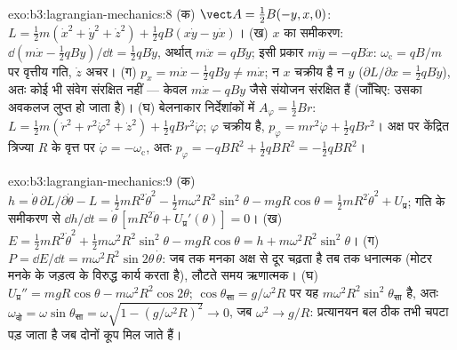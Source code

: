 \begin{solution}{exo:b3:lagrangian-mechanics:8}
(क) $\vect A = \tfrac12 B(-y, x, 0)$:
$L = \tfrac12 m(\dot x^2 + \dot y^2 + \dot z^2) + \tfrac12 qB(x\dot y -
y\dot x)$। (ख) $x$ का समीकरण: $\dd(m\dot x - \tfrac12 qBy)/\dd t =
\tfrac12 qB\dot y$, अर्थात् $m\ddot x = qB\dot y$; इसी प्रकार $m\ddot y =
-qB\dot x$: $\omega_{\text{c}} = qB/m$ पर वृत्तीय गति, $\dot z$
अचर। (ग) $p_x = m\dot x - \tfrac12 qBy \neq m\dot x$; न $x$
चक्रीय है न $y$ ($\partial L/\partial x = \tfrac12 qB\dot y$), अतः
कोई भी संवेग संरक्षित नहीं --- केवल $m\dot x -
qBy$ जैसे संयोजन संरक्षित हैं (जाँचिए: उसका अवकलज लुप्त हो जाता है)।
(घ) बेलनाकार निर्देशांकों में $A_\varphi = \tfrac12 Br$:
$L = \tfrac12 m(\dot r^2 + r^2\dot\varphi^2 + \dot z^2) + \tfrac12
qBr^2\dot\varphi$; $\varphi$ चक्रीय है, $p_\varphi = mr^2\dot\varphi +
\tfrac12 qBr^2$। अक्ष पर केंद्रित त्रिज्या $R$ के वृत्त पर
$\dot\varphi = -\omega_{\text{c}}$, अतः $p_\varphi = -qBR^2 + \tfrac12
qBR^2 = -\tfrac12 qBR^2$।
\end{solution}

\begin{solution}{exo:b3:lagrangian-mechanics:9}
(क) $h = \dot\theta\,\partial L/\partial\dot\theta - L = \tfrac12
mR^2\dot\theta^2 - \tfrac12 m\omega^2R^2\sin^2\theta - mgR\cos\theta =
\tfrac12 mR^2\dot\theta^2 + U_{\text{प्र}}$; गति के समीकरण से $\dd h/\dd t =
\dot\theta\,[mR^2\ddot\theta + U_{\text{प्र}}'(\theta)] = 0$।
(ख) $E = \tfrac12 mR^2\dot\theta^2 + \tfrac12
m\omega^2R^2\sin^2\theta - mgR\cos\theta = h +
m\omega^2R^2\sin^2\theta$। (ग) $P = \dd E/\dd t =
m\omega^2R^2\sin2\theta\,\dot\theta$: जब तक मनका अक्ष से दूर चढ़ता है
तब तक धनात्मक (मोटर मनके के जड़त्व के विरुद्ध कार्य करता है), लौटते
समय ऋणात्मक। (घ) $U_{\text{प्र}}'' = mgR\cos\theta -
m\omega^2R^2\cos2\theta$; $\cos\theta_{\text{सा}} = g/\omega^2R$ पर
यह $m\omega^2R^2\sin^2\theta_{\text{सा}}$ है, अतः
$\omega_{\text{दो}} = \omega\sin\theta_{\text{सा}} = \omega\sqrt{1 -
(g/\omega^2R)^2} \to 0$, जब $\omega^2 \to g/R$: प्रत्यानयन बल ठीक तभी
चपटा पड़ जाता है जब दोनों कूप मिल जाते हैं।
\end{solution}

